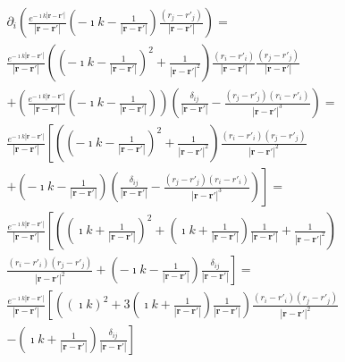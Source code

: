 \documentclass[a4paper,11pt]{thesis}
\begin{document}
\begin{eqnarray}
&&\partial_{i} \left( \frac{e^{- \imath k | \mathbf{r}-\mathbf{r'}|}}{| \mathbf{r}-\mathbf{r'}|} \left( -\imath k- \frac{1}{| \mathbf{r}-\mathbf{r'}|}\right)\frac{(r_j-r'_j)}{| \mathbf{r}-\mathbf{r'}|}\right)=\\
&& \frac{e^{- \imath k | \mathbf{r}-\mathbf{r'}|}}{| \mathbf{r}-\mathbf{r'}|}\left( \left( -\imath k- \frac{1}{| \mathbf{r}-\mathbf{r'}|}\right)^2 +  \frac{1}{| \mathbf{r}-\mathbf{r'}|^2}\right) \frac{(r_i-r'_i)}{| \mathbf{r}-\mathbf{r'}|}\frac{(r_j-r'_j)}{| \mathbf{r}-\mathbf{r'}|} \nonumber \\
&&+  \left( \frac{e^{- \imath k | \mathbf{r}-\mathbf{r'}|}}{| \mathbf{r}-\mathbf{r'}|} \left( -\imath k- \frac{1}{| \mathbf{r}-\mathbf{r'}|}\right)\right) \left( \frac{\delta_{ij}}{| \mathbf{r}-\mathbf{r'}|}-\frac{ (r_j-r'_j)(r_i-r'_i) }{| \mathbf{r}-\mathbf{r'}|^3}\right)=\nonumber\\
&& \frac{e^{- \imath k | \mathbf{r}-\mathbf{r'}|}}{| \mathbf{r}-\mathbf{r'}|}\left[ \left( \left( -\imath k- \frac{1}{| \mathbf{r}-\mathbf{r'}|}\right)^2 +  \frac{1}{| \mathbf{r}-\mathbf{r'}|^2}\right) \frac{(r_i-r'_i)(r_j-r'_j)}{| \mathbf{r}-\mathbf{r'}|^2}\right. \nonumber \\
&&+ \left. \left(   -\imath k- \frac{1}{| \mathbf{r}-\mathbf{r'}|}\right) \left( \frac{\delta_{ij}}{| \mathbf{r}-\mathbf{r'}|}-\frac{ (r_j-r'_j)(r_i-r'_i) }{| \mathbf{r}-\mathbf{r'}|^3}\right) \right] =\nonumber\\
&& \frac{e^{- \imath k | \mathbf{r}-\mathbf{r'}|}}{| \mathbf{r}-\mathbf{r'}|}\left[ \left( \left( \imath k+ \frac{1}{| \mathbf{r}-\mathbf{r'}|}\right)^2 + \left( \imath k+ \frac{1}{| \mathbf{r}-\mathbf{r'}|}\right) \frac{1}{| \mathbf{r}-\mathbf{r'}|} +  \frac{1}{| \mathbf{r}-\mathbf{r'}|^2}\right) \right. \nonumber \\
&&\frac{(r_i-r'_i)(r_j-r'_j)}{| \mathbf{r}-\mathbf{r'}|^2}+ \left. \left(   -\imath k- \frac{1}{| \mathbf{r}-\mathbf{r'}|}\right)  \frac{\delta_{ij}}{| \mathbf{r}-\mathbf{r'}|} \right] =\nonumber\\
&& \frac{e^{- \imath k | \mathbf{r}-\mathbf{r'}|}}{| \mathbf{r}-\mathbf{r'}|}\left[ \left( ( \imath k)^2+ 3 \left( \imath k + \frac{1}{| \mathbf{r}-\mathbf{r'}|} \right)\frac{1}{| \mathbf{r}-\mathbf{r'}|} \right) \frac{(r_i-r'_i)(r_j-r'_j)}{| \mathbf{r}-\mathbf{r'}|^2} \right.  \nonumber \\
&& -\left. \left(   \imath k+ \frac{1}{| \mathbf{r}-\mathbf{r'}|}\right)  \frac{\delta_{ij}}{| \mathbf{r}-\mathbf{r'}|} \right]\nonumber
 \end{eqnarray}
\end{document}

